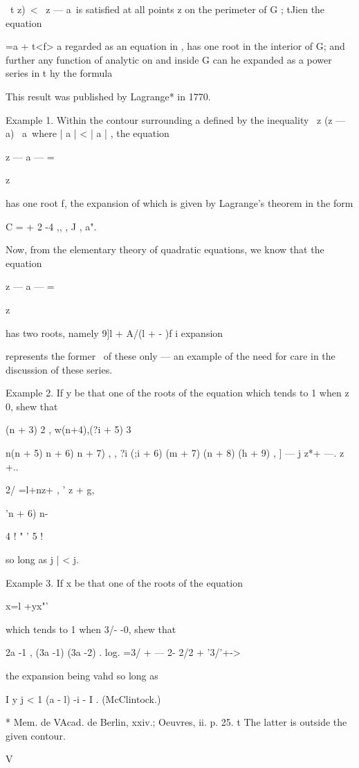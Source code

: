 \ t z)\ < \ z — a\ is satisfied at all points z on the perimeter of G
; tJien the equation

 =a + t<f> a regarded as an equation in , has one root in the interior
of G; and further any function of analytic on and inside G can he
expanded as a power series in t hy the formula

This result was published by Lagrange* in 1770.

Example 1. Within the contour surrounding a defined by the inequality
\ z (z — a) \ a\, where | a | < | a | , the equation

z — a — =

z

has one root f, the expansion of which is given by Lagrange's theorem
in the form

C = + 2 -4 ,, , J , a".

Now, from the elementary theory of quadratic equations, we know that
the equation

z — a — =

z

has two roots, namely 9]l + A/(l + - )f i %
expansion

represents the former \ of these only — an example of the need for
care in the discussion of these series.

Example 2. If y be that one of the roots of the equation which tends
to 1 when z~ 0, shew that

 (n + 3) 2 , w(n+4),(?i + 5) 3

n(n + 5) n + 6) n + 7) , , ?i (;i + 6) (m + 7) (n + 8) (h + 9) , ] — j
z*+ —. z +..

2/ =l+nz+ , ' z + g,

'n + 6) n-

4 ! " ' 5 !

so long as j | < j.

Example 3. If x be that one of the roots of the equation

x=l +yx"'

which tends to 1 when 3/- -0, shew that

2a -1 , (3a -1) (3a -2) . log. =3/ + — 2- 2/2 + '3/'+->

the expansion being vahd so long as

I y j < 1 (a - l) -i - I . (McClintock.)

* Mem. de VAcad. de Berlin, xxiv.; Oeuvres, ii. p. 25. t The latter is
outside the given contour.

V

